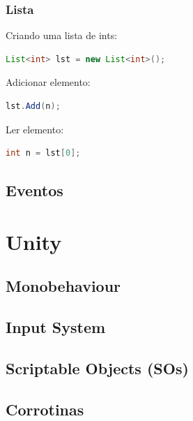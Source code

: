\documentclass{beamer}
\begin{document}
	\begin{frame}[fragile]
		\frametitle{Lista}

		Criando uma lista de ints:
		\begin{lstlisting}[language=Java,basicstyle=\ttfamily,keywordstyle=\color{blue}]
List<int> lst = new List<int>();
		\end{lstlisting}

		Adicionar elemento:
		\begin{lstlisting}[language=Java,basicstyle=\ttfamily,keywordstyle=\color{blue}]
lst.Add(n);
		\end{lstlisting}

		Ler elemento:
		\begin{lstlisting}[language=Java,basicstyle=\ttfamily,keywordstyle=\color{blue}]
int n = lst[0];
		\end{lstlisting}

	\end{frame}

	\subsection{Eventos}

	\section{Unity}
	\subsection{Monobehaviour}
	\subsection{Input System}
	\subsection{Scriptable Objects (SOs)}
	\subsection{Corrotinas}
\end{document}

